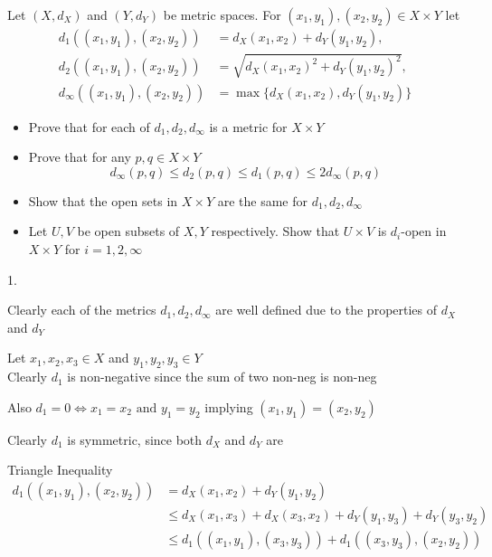 \documentclass{article}
\begin{document}
\begin{problem}
Let \( (X,d_X) \) and \( (Y,d_Y) \) be metric spaces. For \( (x_1,y_1), (x_2,y_2) \in X \times Y \) let
\begin{align*}
	d_1((x_1,y_1), (x_2,y_2))        & = d_X(x_1,x_2) + d_Y(y_1,y_2),                \\
	d_2((x_1,y_1), (x_2,y_2))        & = \sqrt{d_X(x_1,x_2)^2 + d_Y(y_1, y_2)^2},    \\
	d_{\infty}((x_1,y_1), (x_2,y_2)) & = \max\{d_X(x_{1}, x_{2}), d_Y(y_{1},y_{2})\}
\end{align*}
\begin{itemize}
	\item Prove that for each of \( d_1,d_2,d_{\infty} \) is a metric for \( X \times Y \)
	\item Prove that for any \( p,q \in X \times Y \)
	      \[
		      d_{\infty}(p,q) \le d_2(p,q) \le d_1(p,q) \le 2d_{\infty}(p,q)
	      \]
	\item Show that the open sets in \( X \times Y \) are the same for \( d_1, d_2,d_{\infty} \)
	\item Let \( U,V \) be open subsets of \( X,Y \) respectively. Show that \( U \times V \) is \( d_i \)-open in \( X \times Y \) for \( i = 1,2, \infty \)
\end{itemize}

\begin{solution}1.

	Clearly each of the metrics \( d_1,d_{2}, d_{\infty} \) are well defined due to the properties of \( d_X \) and \( d_Y \)

	Let \( x_{1},x_{2},x_{3} \in X \) and \( y_{1}, y_{2},y_{3} \in  Y \)
	\\

	Clearly \( d_1 \) is non-negative since the sum of two non-neg is non-neg

	Also \( d_1 = 0 \iff x_{1} = x_{2} \text{ and } y_{1} = y_{2} \) implying \( (x_{1},y_{1}) = (x_{2},y_{2}) \)

	Clearly \( d_1 \) is symmetric, since both \( d_X \) and \( d_Y \) are

	Triangle Inequality
	\begin{align*}
		d_{1}((x_{1},y_{1}),(x_{2},y_{2})) & = d_X(x_{1},x_{2}) + d_Y(y_{1},y_{2})                                         \\
		                                   & \le d_X(x_{1},x_{3}) + d_X(x_{3},x_{2}) + d_Y(y_{1},y_{3}) + d_Y(y_{3},y_{2}) \\
		                                   & \le d_1((x_{1},y_{1}),(x_{3},y_{3})) + d_{1}((x_{3},y_{3}),(x_{2},y_{2}))
	\end{align*}


\end{solution}
\end{problem}
\end{document}
